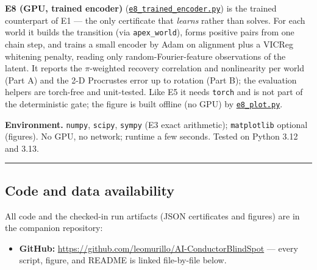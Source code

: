 \documentclass[
  letterpaper,
  11pt]{article}
\providecommand{\tightlist}{%
  \setlength{\itemsep}{0pt}\setlength{\parskip}{0pt}}
\theoremstyle{plain}
\theoremstyle{definition}
\theoremstyle{remark}
\begin{document}
\textbf{E8 (GPU, trained encoder)} (\href{https://github.com/leomurillo/AI-ConductorBlindSpot/blob/main/empirical/apex_recovery/e8_trained_encoder.py}{\texttt{e8\_trained\_encoder.py}}) is the trained counterpart of E1 --- the only certificate that \emph{learns} rather than solves. For each world it builds the transition (via \texttt{apex\_world}), forms positive pairs from one chain step, and trains a small encoder by Adam on alignment plus a VICReg whitening penalty, reading only random-Fourier-feature observations of the latent. It reports the \(\pi\)-weighted recovery correlation and nonlinearity per world (Part A) and the 2-D Procrustes error up to rotation (Part B); the evaluation helpers are torch-free and unit-tested. Like E5 it needs \texttt{torch} and is not part of the deterministic gate; the figure is built offline (no GPU) by \href{https://github.com/leomurillo/AI-ConductorBlindSpot/blob/main/empirical/apex_recovery/e8_plot.py}{\texttt{e8\_plot.py}}.

\textbf{Environment.} \texttt{numpy}, \texttt{scipy}, \texttt{sympy} (E3 exact arithmetic); \texttt{matplotlib} optional (figures). No GPU, no network; runtime a few seconds. Tested on Python 3.12 and 3.13.

\begin{center}\rule{0.5\linewidth}{0.5pt}\end{center}

\subsection{Code and data availability}\label{sec:code-and-data}

All code and the checked-in run artifacts (JSON certificates and figures) are in the companion repository:

\begin{itemize}
\tightlist
\item
  \textbf{GitHub:} \url{https://github.com/leomurillo/AI-ConductorBlindSpot} --- every script, figure, and README is linked file-by-file below.
\end{itemize}
\end{document}
